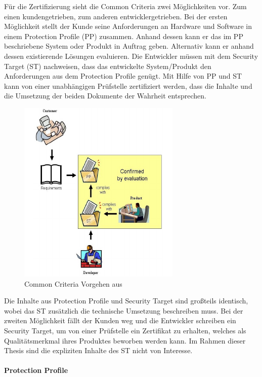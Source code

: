 \documentclass[11pt,a4paper]{report}
\begin{document}
Für die Zertifizierung sieht die Common Criteria zwei Möglichkeiten vor. Zum einen kundengetrieben, zum anderen entwicklergetrieben. Bei der ersten Möglichkeit stellt der Kunde seine Anforderungen an Hardware und Software in einem Protection Profile (PP) zusammen. Anhand dessen kann er das im PP beschriebene System oder Produkt in Auftrag geben. Alternativ kann er anhand dessen existierende Lösungen evaluieren. Die Entwickler müssen mit dem Security Target (ST) nachweisen, dass das entwickelte System/Produkt den Anforderungen aus dem Protection Profile genügt. Mit Hilfe von PP und ST kann von einer unabhängigen Prüfstelle zertifiziert werden, dass die Inhalte und die Umsetzung der beiden Dokumente der Wahrheit entsprechen.

\begin{figure}[htbp]
\centering
\includegraphics[scale=1.3]{images/cc_prozess.pdf}
\caption[]{Common Criteria Vorgehen aus \cite{bsi_ccguide}}
\label{fig:cc_prozess}
\end{figure}

Die Inhalte aus Protection Profile und Security Target sind großteils identisch, wobei das ST zusätzlich die technische Umsetzung beschreiben muss. Bei der zweiten Möglichkeit fällt der Kunden weg und die Entwickler schreiben ein Security Target, um von einer Prüfstelle ein Zertifikat zu erhalten, welches als Qualitätsmerkmal ihres Produktes beworben werden kann. Im Rahmen dieser Thesis sind die expliziten Inhalte des ST nicht von Interesse.

\paragraph{Protection Profile}
\end{document}
